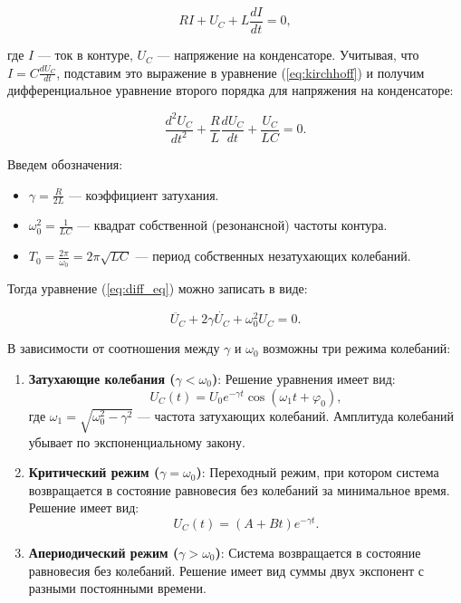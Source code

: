 \documentclass[a4paper]{article}
\begin{document}
\begin{equation}
RI + U_C + L\frac{dI}{dt} = 0,
\label{eq:kirchhoff}
\end{equation}

где $I$ — ток в контуре, $U_C$ — напряжение на конденсаторе. Учитывая, что $I = C\frac{dU_C}{dt}$, подставим это выражение в уравнение (\ref{eq:kirchhoff}) и получим дифференциальное уравнение второго порядка для напряжения на конденсаторе:

\begin{equation}
\frac{d^2U_C}{dt^2} + \frac{R}{L}\frac{dU_C}{dt} + \frac{U_C}{LC} = 0.
\label{eq:diff_eq}
\end{equation}

Введем обозначения:
\begin{itemize}
\item $\gamma = \frac{R}{2L}$ — коэффициент затухания.
    \item $\omega_0^2 = \frac{1}{LC}$ — квадрат собственной (резонансной) частоты контура.
    \item $T_0 = \frac{2\pi}{\omega_0} = 2\pi\sqrt{LC}$ — период собственных незатухающих колебаний.
\end{itemize}

Тогда уравнение (\ref{eq:diff_eq}) можно записать в виде:

\begin{equation}
\ddot{U_C} + 2\gamma\dot{U_C} + \omega_0^2 U_C = 0.
\label{eq:diff_eq_simple}
\end{equation}

В зависимости от соотношения между $\gamma$ и $\omega_0$ возможны три режима колебаний:

\begin{enumerate}
    \item \textbf{Затухающие колебания ($\gamma < \omega_0$)}: Решение уравнения имеет вид:
    \begin{equation}
    U_C(t) = U_0 e^{-\gamma t} \cos(\omega_1 t + \varphi_0),
    \label{eq:free_oscillations}
    \end{equation}
    где $\omega_1 = \sqrt{\omega_0^2 - \gamma^2}$ — частота затухающих колебаний. Амплитуда колебаний убывает по экспоненциальному закону.

    \item \textbf{Критический режим ($\gamma = \omega_0$)}: Переходный режим, при котором система возвращается в состояние равновесия без колебаний за минимальное время. Решение имеет вид:
    \begin{equation}
    U_C(t) = (A + Bt)e^{-\gamma t}.
    \end{equation}

    \item \textbf{Апериодический режим ($\gamma > \omega_0$)}: Система возвращается в состояние равновесия без колебаний. Решение имеет вид суммы двух экспонент с разными постоянными времени.
\end{enumerate}
\end{document}
